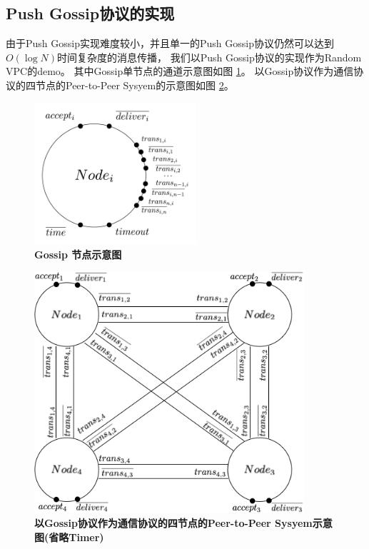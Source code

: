 \subsection{Push Gossip协议的实现}
由于Push Gossip实现难度较小，并且单一的Push Gossip协议仍然可以达到$O(\log N)$时间复杂度的消息传播，
我们以Push Gossip协议的实现作为Random VPC的demo。
其中Gossip单节点的通道示意图如图
\ref{fig1}。
以Gossip协议作为通信协议的四节点的Peer-to-Peer Sysyem的示意图如图
\ref{fig2}。

\begin{figure}[!htbp]
	\small
	\centering
	\includegraphics[width=6cm]{../figure/Node_gossip.png}
    \caption{\textbf{Gossip 节点示意图}}
    \label{fig1}
\end{figure}

\begin{figure}[!htbp]
	\small
	\centering
	\includegraphics[width=10cm]{../figure/GossipSystem_4.png}
    \caption{\textbf{以Gossip协议作为通信协议的四节点的Peer-to-Peer Sysyem示意图(省略Timer)}}
    \label{fig2}
\end{figure}

